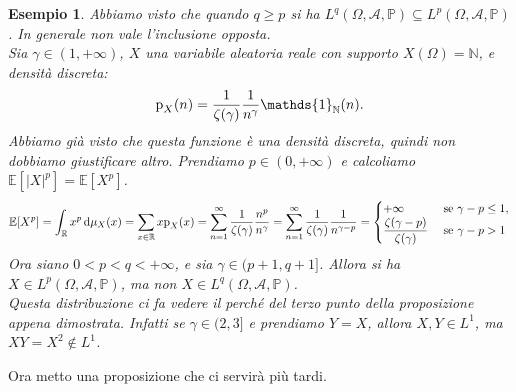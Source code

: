 \documentclass[11pt]{book}
\theoremstyle{Definizione}
\theoremstyle{TeoremaProposizioneLemmaCorollario}
\theoremstyle{OsservazioneNota}
\newtheorem{myes}{Esempio}[section]
\newcommand{\R}{\mathbb{R}}
\newcommand{\N}{\mathbb{N}}
\renewcommand{\P}{\mathbb{P}}
\renewcommand{\d}{\mathrm{d}}
\newcommand{\p}{\textup{p}}
\newcommand{\E}{\mathbb{E}}
\newcommand{\uno}[1]{\mathds{1}_{#1}}
\begin{document}
\begin{myes}
Abbiamo visto che quando $q \geq p$ si ha $L^q(\Omega,\mathcal{A},\P) \subseteq L^p(\Omega,\mathcal{A},\P)$. In generale non vale l'inclusione opposta.\\
Sia $\gamma \in (1,+\infty)$, $X$ una variabile aleatoria reale con supporto $X(\Omega) = \N$, e densità discreta:
$$
\p_X(n) = \frac{1}{\zeta(\gamma)}\frac{1}{n^\gamma}\uno{\N}(n).
$$
Abbiamo già visto che questa funzione è una densità discreta, quindi non dobbiamo giustificare altro. Prendiamo $p\in (0,+\infty)$ e calcoliamo $\E[|X|^p] = \E[X^p]$.
$$
\E[X^p] = \int_\R x^p \,\d\mu_X(x) = \sum_{x\in \R} x \p_X(x) = \sum_{n = 1}^\infty \frac{1}{\zeta(\gamma)} \frac{n^p}{n^\gamma} = \sum_{n = 1}^\infty \frac{1}{\zeta(\gamma)} \frac{1}{n^{\gamma-p}} = \begin{cases}
+\infty &\textup{ se }\gamma-p \leq 1,\\
\displaystyle\frac{\zeta(\gamma-p)}{\zeta(\gamma)}&\textup{ se }\gamma -p > 1
\end{cases}
$$
Ora siano $0<p < q<+\infty$, e sia $\gamma\in (p+1,q+1]$. Allora si ha $X \in L^p(\Omega,\mathcal{A},\P)$, ma non $ X\in L^q(\Omega,\mathcal{A},\P)$.\\
Questa distribuzione ci fa vedere il perché del terzo punto della proposizione appena dimostrata. Infatti se $\gamma\in (2,3]$ e prendiamo $Y = X$, allora $X,Y\in L^1$, ma $XY = X^2 \notin L^1$.
\end{myes}
Ora metto una proposizione che ci servirà più tardi.
\end{document}
